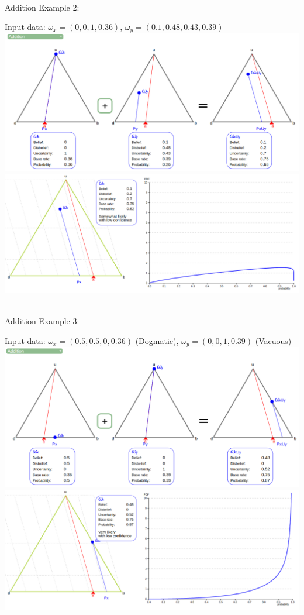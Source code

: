 \documentclass[UTF8]{article}
\newcommand{\opinion}[5]{$\omega_{#1} = (#2, #3, #4, #5)$}
\begin{document}
\hrulefill\\
Addition Example 2:
    \begin{center}
        Input data: 
        \opinion{x}{0}{0}{1}{0.36}, 
        \opinion{y}{0.1}{0.48}{0.43}{0.39}\\
        \includegraphics[width=6in]{images/add2.png}
        \includegraphics[width=6in]{images/add2viz.png}
    \end{center}
    \hrulefill\\
Addition Example 3:
    \begin{center}
        Input data: 
        \opinion{x}{0.5}{0.5}{0}{0.36} (Dogmatic), 
        \opinion{y}{0}{0}{1}{0.39} (Vacuous)\\
        \includegraphics[width=6in]{images/add3.png}
        \includegraphics[width=6in]{images/add3viz.png}
    \end{center}
\end{document}
